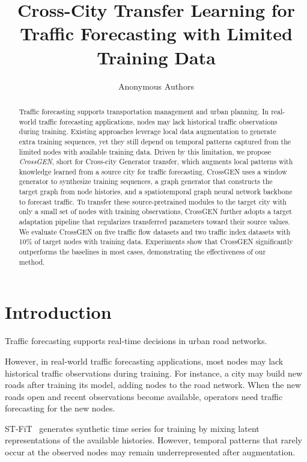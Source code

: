 \documentclass[runningheads,a4paper]{llncs}
\title{Cross-City Transfer Learning for Traffic Forecasting with Limited Training Data}
\author{Anonymous Authors}
\institute{}
\begin{document}
\maketitle

\begin{abstract}

Traffic forecasting supports transportation management and urban planning.
In real-world traffic forecasting applications,  nodes may lack historical traffic observations during training.
Existing approaches leverage local data augmentation to generate extra training sequences, yet they still depend on temporal patterns captured from the limited nodes with available training data.
Driven by this limitation, we propose \emph{CrossGEN}, short for Cross-city Generator transfer, which augments local patterns with knowledge learned from a source city for traffic forecasting.
CrossGEN uses a window generator to synthesize training sequences, a graph generator that constructs the target graph from node histories, and a spatiotemporal graph neural network backbone to forecast traffic.
To transfer these source-pretrained modules to the target city with only a small set of nodes with training observations, CrossGEN further adopts a target adaptation pipeline that regularizes transferred parameters toward their source values.
We evaluate CrossGEN on five traffic flow datasets and two traffic index datasets with 10\% of target nodes with training data. Experiments show that CrossGEN significantly outperforms the baselines in most cases, demonstrating the effectiveness of our method.


\end{abstract}

\section{Introduction}
Traffic  forecasting supports real-time decisions in urban road networks.

However, in real-world traffic forecasting applications, most nodes may lack historical traffic observations during training. For instance, a city may build new roads after training its model, adding nodes to the road network. When the new roads open and recent observations become available, operators need traffic forecasting for the new nodes.

ST-FiT~\cite{stfit} generates synthetic time series for training by mixing latent representations of the available histories.
However, temporal patterns that rarely occur at the observed nodes may remain underrepresented after augmentation.
\end{document}
